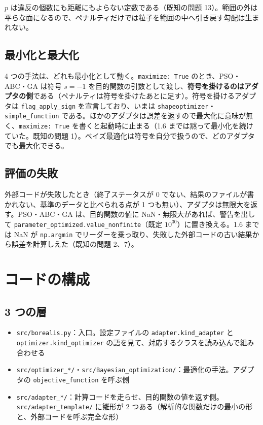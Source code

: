 \documentclass[11pt,a4paper,dvipdfmx]{jsarticle}
\begin{document}
$p$ は違反の個数にも距離にもよらない定数である（既知の問題 13）。範囲の外は平らな面になるので、ペナルティだけでは粒子を範囲の中へ引き戻す勾配は生まれない。

\subsection{最小化と最大化}

4 つの手法は、どれも最小化として動く。\texttt{maximize: True} のとき、PSO・ABC・GA は符号 $s = -1$ を目的関数の引数として渡し、\textbf{符号を掛けるのはアダプタの側}である（ペナルティは符号を掛けたあとに足す）。符号を掛けるアダプタは \texttt{flag\_apply\_sign} を宣言しており、いまは \texttt{shapeoptimizer}・\texttt{simple\_function} である。ほかのアダプタは誤差を返すので最大化に意味が無く、\texttt{maximize: True} を書くと起動時に止まる（1.6 までは黙って最小化を続けていた。既知の問題 1）。ベイズ最適化は符号を自分で扱うので、どのアダプタでも最大化できる。

\subsection{評価の失敗}

外部コードが失敗したとき（終了ステータスが 0 でない、結果のファイルが書かれない、基準のデータと比べられる点が 1 つも無い）、アダプタは無限大を返す。PSO・ABC・GA は、目的関数の値に NaN・無限大があれば、警告を出して \texttt{parameter\_optimized.value\_nonfinite}（既定 $10^{30}$）に置き換える。1.6 までは NaN が \texttt{np.argmin} でリーダーを乗っ取り、失敗した外部コードの古い結果から誤差を計算しえた（既知の問題 2、7）。

\section{コードの構成}\label{sec:structure}

\subsection{3 つの層}

\begin{itemize}
\item \texttt{src/borealis.py}：入口。設定ファイルの \texttt{adapter.kind\_adapter} と \texttt{optimizer.kind\_optimizer} の語を見て、対応するクラスを読み込んで組み合わせる
\item \texttt{src/optimizer\_*/}・\texttt{src/Bayesian\_optimization/}：最適化の手法。アダプタの \texttt{objective\_function} を呼ぶ側
\item \texttt{src/adapter\_*/}：計算コードを走らせ、目的関数の値を返す側。\texttt{src/adapter\_template/} に雛形が 2 つある（解析的な関数だけの最小の形と、外部コードを呼ぶ完全な形）
\end{itemize}
\end{document}
